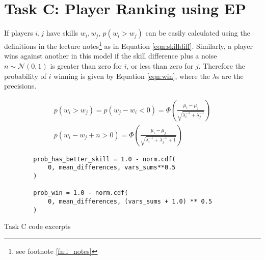 \documentclass[11pt]{amsart}
\begin{document}
\section{Task C: Player Ranking using EP} \label{sec:c}
If players $ i,j $ have skills $ w_i, w_j $, $ p(w_i > w_j) $ can be easily calculated using the definitions in the lecture notes\footnote{see footnote \ref{fn:l_notes}} as in Equation \ref{eqn:skilldiff}. Similarly, a player wins against another in this model if the skill difference plus a noise $ n \sim \mathcal{N}(0,1)$ is greater than zero for $i$, or less than zero for $j$. Therefore the probability of $i$ winning is given by Equation \ref{eqn:win}, where the $\lambda$s are the precisions.

\begin{eqnarray}
    p(w_i > w_j) = p(w_j-w_i < 0) =\Phi \left(\frac{\mu_i - \mu_j}{\sqrt{\lambda_i^{-1} + \lambda_j^{-1}}}\right) \\ \label{eqn:skilldiff}
    p(w_i - w_j + n > 0) = \Phi \left(\frac{\mu_i - \mu_j}{\sqrt{\lambda_i^{-1} + \lambda_j^{-1} + 1}}\right) \label{eqn:win}
\end{eqnarray}

\begin{listing}[h]
    \begin{verbatim}
        prob_has_better_skill = 1.0 - norm.cdf(
            0, mean_differences, vars_sums**0.5
        )

        prob_win = 1.0 - norm.cdf(
            0, mean_differences, (vars_sums + 1.0) ** 0.5
        )
    \end{verbatim}
    \caption{Task C code excerpts} \label{lst:cw2c}
\end{listing}
\end{document}
